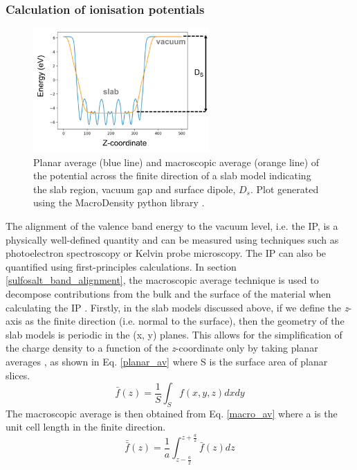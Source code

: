\documentclass[11pt, twoside]{report}
\begin{document}
\subsubsection{Calculation of ionisation potentials}

\begin{figure}[h!]
  \centering
    \includegraphics[width=0.6\textwidth]{figures/MD_eg.png}
    \caption[Planar average (blue line) and macroscopic average (orange line) of the potential across the finite direction of a slab model indicating the slab region, vacuum gap and surface dipole, $D_s$.]{Planar average (blue line) and macroscopic average (orange line) of the potential across the finite direction of a slab model indicating the slab region, vacuum gap and surface dipole, $D_s$. Plot generated using the MacroDensity python library \cite{MacroDensity}.}
  \label{MD_eg}
\end{figure}

The alignment of the valence band energy to the vacuum level, i.e. the IP, is a physically well-defined quantity and can be measured using techniques such as photoelectron spectroscopy or Kelvin probe microscopy. The IP can also be quantified using first-principles calculations. In section \ref{sulfosalt_band_alignment}, the macroscopic average technique is used to decompose contributions from the bulk and the surface of the material when calculating the IP \cite{macro_pot_IP}.
Firstly, in the slab models discussed above, if we define the \textit{z}-axis as the finite direction (i.e. normal to the surface), then the geometry of the slab models is periodic in the (x, y) planes. This allows for the simplification of the charge density to a function of the \textit{z}-coordinate only by taking planar averages \cite{band_engineering}, as shown in Eq. \ref{planar_av} where S is the surface area of planar slices.
\begin{equation}\label{planar_av}
\bar{f}(z) = \frac{1}{S}\int_S f(x,y,z)dxdy
\end{equation}
The macroscopic average is then obtained from Eq. \ref{macro_av} where a is the unit cell length in the finite direction.
\begin{equation}\label{macro_av}
\bar{\bar{f}}(z) = \frac{1}{a} \int_{z-\frac{a}{2}}^{z+\frac{a}{2}}  \bar{f}(z) dz
\end{equation}
\end{document}
